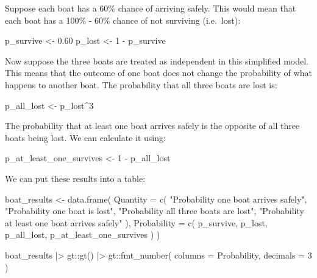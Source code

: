 \documentclass[
  letterpaper,
  DIV=11,
  numbers=noendperiod]{scrreprt}
\newenvironment{Shaded}{\begin{snugshade}}{\end{snugshade}}
\newcommand{\AttributeTok}[1]{\textcolor[rgb]{0.40,0.45,0.13}{#1}}
\newcommand{\DecValTok}[1]{\textcolor[rgb]{0.68,0.00,0.00}{#1}}
\newcommand{\FloatTok}[1]{\textcolor[rgb]{0.68,0.00,0.00}{#1}}
\newcommand{\FunctionTok}[1]{\textcolor[rgb]{0.28,0.35,0.67}{#1}}
\newcommand{\NormalTok}[1]{\textcolor[rgb]{0.00,0.23,0.31}{#1}}
\newcommand{\OtherTok}[1]{\textcolor[rgb]{0.00,0.23,0.31}{#1}}
\newcommand{\SpecialCharTok}[1]{\textcolor[rgb]{0.37,0.37,0.37}{#1}}
\newcommand{\StringTok}[1]{\textcolor[rgb]{0.13,0.47,0.30}{#1}}
\begin{document}
Suppose each boat has a 60\% chance of arriving safely. This would mean
that each boat has a 100\% - 60\% chance of not surviving (i.e.~lost):

\begin{Shaded}
\begin{Highlighting}[]
\NormalTok{p\_survive }\OtherTok{\textless{}{-}} \FloatTok{0.60}
\NormalTok{p\_lost }\OtherTok{\textless{}{-}} \DecValTok{1} \SpecialCharTok{{-}}\NormalTok{ p\_survive}
\end{Highlighting}
\end{Shaded}

Now suppose the three boats are treated as independent in this
simplified model. This means that the outcome of one boat does not
change the probability of what happens to another boat. The probability
that all three boats are lost is:

\begin{Shaded}
\begin{Highlighting}[]
\NormalTok{p\_all\_lost }\OtherTok{\textless{}{-}}\NormalTok{ p\_lost}\SpecialCharTok{\^{}}\DecValTok{3}
\end{Highlighting}
\end{Shaded}

The probability that at least one boat arrives safely is the opposite of
all three boats being lost. We can calculate it using:

\begin{Shaded}
\begin{Highlighting}[]
\NormalTok{p\_at\_least\_one\_survives }\OtherTok{\textless{}{-}} \DecValTok{1} \SpecialCharTok{{-}}\NormalTok{ p\_all\_lost}
\end{Highlighting}
\end{Shaded}

We can put these results into a table:

\begin{Shaded}
\begin{Highlighting}[]
\NormalTok{boat\_results }\OtherTok{\textless{}{-}} \FunctionTok{data.frame}\NormalTok{(}
  \AttributeTok{Quantity =} \FunctionTok{c}\NormalTok{(}
    \StringTok{"Probability one boat arrives safely"}\NormalTok{,}
    \StringTok{"Probability one boat is lost"}\NormalTok{,}
    \StringTok{"Probability all three boats are lost"}\NormalTok{,}
    \StringTok{"Probability at least one boat arrives safely"}
\NormalTok{  ),}
  \AttributeTok{Probability =} \FunctionTok{c}\NormalTok{(}
\NormalTok{    p\_survive,}
\NormalTok{    p\_lost,}
\NormalTok{    p\_all\_lost,}
\NormalTok{    p\_at\_least\_one\_survives}
\NormalTok{  )}
\NormalTok{)}

\NormalTok{boat\_results }\SpecialCharTok{|\textgreater{}}
\NormalTok{  gt}\SpecialCharTok{::}\FunctionTok{gt}\NormalTok{() }\SpecialCharTok{|\textgreater{}}
\NormalTok{  gt}\SpecialCharTok{::}\FunctionTok{fmt\_number}\NormalTok{(}
    \AttributeTok{columns =}\NormalTok{ Probability,}
    \AttributeTok{decimals =} \DecValTok{3}
\NormalTok{  )}
\end{Highlighting}
\end{Shaded}
\end{document}
